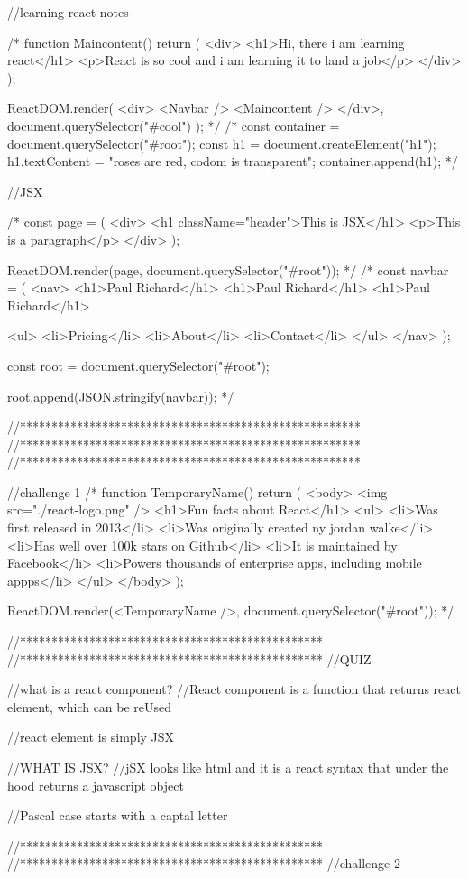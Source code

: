 //learning react notes

/* function Maincontent() {
  return (
    <div>
      <h1>Hi, there i am learning react</h1>
      <p>React is so cool and i am learning it to land a job</p>
    </div>
  );
}

ReactDOM.render(
  <div>
    <Navbar />
    <Maincontent />
  </div>,
  document.querySelector("#cool")
);
 */
/* 
const container = document.querySelector("#root");
const h1 = document.createElement("h1");
h1.textContent = "roses are red, codom is transparent";
container.append(h1); */

//JSX

/* const page = (
  <div>
    <h1 className="header">This is JSX</h1>
    <p>This is a paragraph</p>
  </div>
);

ReactDOM.render(page, document.querySelector("#root"));
 */
/* 
const navbar = (
  <nav>
    <h1>Paul Richard</h1>
    <h1>Paul Richard</h1>
    <h1>Paul Richard</h1>

    <ul>
      <li>Pricing</li>
      <li>About</li>
      <li>Contact</li>
    </ul>
  </nav>
);

const root = document.querySelector("#root");

root.append(JSON.stringify(navbar));
 */

//******************************************************
//******************************************************
//******************************************************

//challenge 1
/* 
function TemporaryName() {
  return (
    <body>
      <img src="./react-logo.png" />
      <h1>Fun facts about React</h1>
      <ul>
        <li>Was first released in 2013</li>
        <li>Was originally created ny jordan walke</li>
        <li>Has well over 100k stars on Github</li>
        <li>It is maintained by Facebook</li>
        <li>Powers thousands of enterprise apps, including mobile appps</li>
      </ul>
    </body>
  );
}

ReactDOM.render(<TemporaryName />, document.querySelector("#root"));
 */

//************************************************
//************************************************
//QUIZ

//what is a react component?
//React component is a function that returns react element, which can be reUsed

//react element is simply JSX

//WHAT IS JSX?
//jSX looks like html and it is a react syntax that under the hood returns a javascript object

//Pascal case starts with a captal letter

//************************************************
//************************************************
//challenge 2
